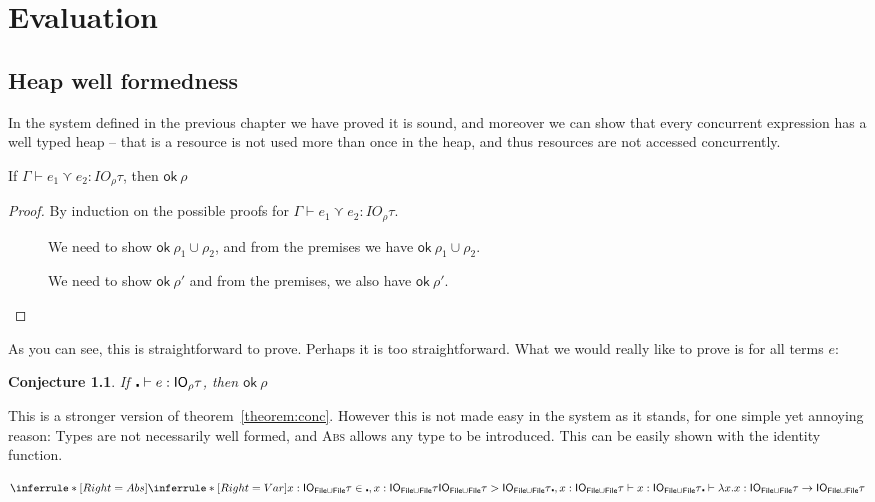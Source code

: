\chapter{Evaluation} \label{chapter:evaluation}

\section{Heap well formedness}
In the system defined in the previous chapter we have proved it is
sound, and moreover we can show that every concurrent expression has a
well typed heap -- that is a resource is not used more than once in the
heap, and thus resources are not accessed concurrently.

\begin{theorem}
  If $\Gamma \vdash e_1 \curlyvee e_2 : IO_\rho \tau$, then $\textsf{ok} \ \rho$
  \label{theorem:conc}
\end{theorem}
\begin{proof}
  By induction on the possible proofs for $\Gamma \vdash e_1 \curlyvee e_2 : IO_\rho \tau$.
  \begin{description}
  \item[\textmd{}]
    We need to show $\textsf{ok} \ \rho_1 \cup \rho_2$, and from the premises we have $\textsf{ok} \ \rho_1 \cup \rho_2$.
  \item[\textmd{}]
    We need to show $\textsf{ok} \ \rho'$ and from the premises, we also have $\textsf{ok} \ \rho'$. 
  \end{description}
\end{proof}
As you can see, this is straightforward to prove. Perhaps it is too
straightforward. What we would really like to prove is for all terms
$e$:
\newtheorem{conjecture}{Conjecture}
\begin{conjecture}
  If $\centerdot \vdash e : \mathsf{IO}_\rho \tau$, then $\textsf{ok} \ \rho$
  \label{conjecture:strongconc}
\end{conjecture}
This is a stronger version of theorem~\ref{theorem:conc}. However this
is not made easy in the system as it stands, for one simple yet
annoying reason: Types are not necessarily well formed, and
\textsc{Abs} allows any type to be introduced. This can be easily
shown with the identity function.

$$\inferrule*[Right=Abs]{
  \inferrule*[Right=Var]{x : \IO_{\textsf{File} \cup \textsf{File}} \tau  \in
    \centerdot , x : \IO_{\textsf{File} \cup \textsf{File}} \tau \\  \IO_{\textsf{File} \cup \textsf{File}} \tau >
    \IO_{\textsf{File} \cup \textsf{File}} \tau }{\centerdot , x : \IO_{\textsf{File} \cup
      \textsf{File}} \tau \vdash x : \IO_{\textsf{File} \cup \textsf{File}} \tau}
}
{\centerdot \vdash \lambda x . x : \IO_{\textsf{File} \cup \textsf{File}} \tau \rightarrow \IO_{\textsf{File} \cup \textsf{File}} \tau}
$$

